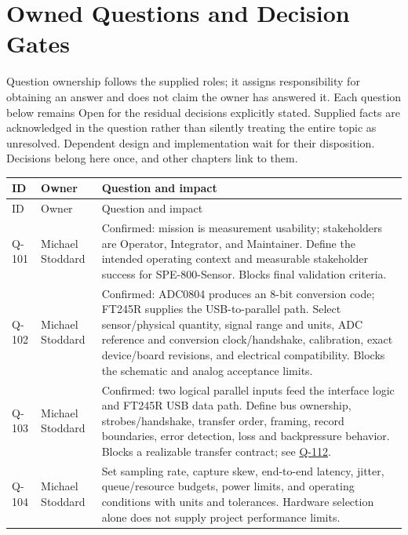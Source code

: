 \section{Owned Questions and Decision Gates}
\label{Section:OwnedQuestions}
Question ownership follows the supplied roles; it assigns responsibility for obtaining an answer and does not claim the owner has answered it. Each question below remains Open for the residual decisions explicitly stated. Supplied facts are acknowledged in the question rather than silently treating the entire topic as unresolved. Dependent design and implementation wait for their disposition. Decisions belong here once, and other chapters link to them.
\small
\begin{tabularx}{\linewidth}{L{1.3cm}L{3.1cm}Y}
\caption{Owned Questions\label{Table:OwnedQuestions}}\\
\toprule
ID & Owner & Question and impact\\\midrule
\endfirsthead
\toprule
ID & Owner & Question and impact\\\midrule
\endhead
\bottomrule
\endlastfoot
{}\label{Question:Q-101}Q-101 & Michael Stoddard & Confirmed: mission is measurement usability; stakeholders are Operator, Integrator, and Maintainer. Define the intended operating context and measurable stakeholder success for SPE-800-Sensor. Blocks final validation criteria.\\
\label{Question:Q-102}Q-102 & Michael Stoddard & Confirmed: ADC0804 produces an 8-bit conversion code; FT245R supplies the USB-to-parallel path. Select sensor/physical quantity, signal range and units, ADC reference and conversion clock/handshake, calibration, exact device/board revisions, and electrical compatibility. Blocks the schematic and analog acceptance limits.\\
\label{Question:Q-103}Q-103 & Michael Stoddard & Confirmed: two logical parallel inputs feed the interface logic and FT245R USB data path. Define bus ownership, strobes/handshake, transfer order, framing, record boundaries, error detection, loss and backpressure behavior. Blocks a realizable transfer contract; see \hyperref[Question:Q-112]{Q-112}.\\
\label{Question:Q-104}Q-104 & Michael Stoddard & Set sampling rate, capture skew, end-to-end latency, jitter, queue/resource budgets, power limits, and operating conditions with units and tolerances. Hardware selection alone does not supply project performance limits.\\

\end{tabularx}
